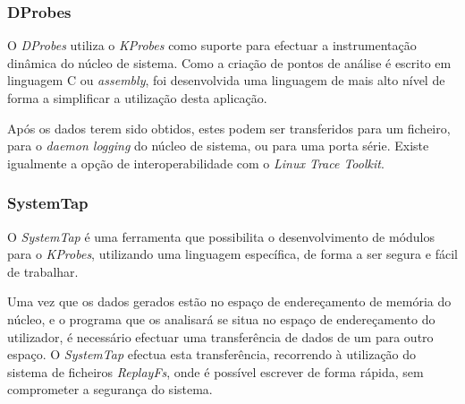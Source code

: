 \subsubsection{DProbes}\label{cap:Dprobe_overview}


O \textit{DProbes} utiliza o \textit{KProbes} como suporte para efectuar a instrumentação dinâmica do núcleo de sistema.
Como a criação de pontos de análise é escrito em linguagem C ou \textit{assembly}, foi desenvolvida uma linguagem de mais alto nível de forma a simplificar  a utilização desta aplicação.

Após os dados terem sido obtidos, estes podem ser transferidos para um ficheiro, para o \textit{daemon logging} do núcleo de sistema, ou para uma porta série.
Existe igualmente a opção de interoperabilidade com o \textit{Linux Trace Toolkit}\cite{:DProbes}.

\subsubsection{SystemTap}\label{cap:Systemtap_overview}
O \textit{SystemTap} é uma ferramenta que possibilita o desenvolvimento de módulos para o \textit{KProbes}, utilizando uma linguagem específica, de forma a ser segura e fácil de trabalhar.



Uma vez que os dados gerados estão no espaço de endereçamento de memória do núcleo, e o programa que os analisará se situa no espaço de endereçamento do utilizador, é necessário efectuar uma transferência de dados de um para outro espaço.
O \textit{SystemTap} efectua esta transferência, recorrendo à utilização do sistema de ficheiros \textit{ReplayFs}, onde é possível escrever de forma rápida, sem comprometer a segurança do sistema.\cite{Donovan2007,Jones2009}

